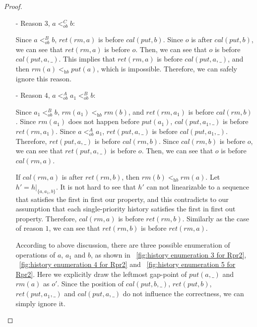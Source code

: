 \documentclass{llncs}
\begin{document}
\begin {proof}
\begin{itemize}
\item[-] Reason $3$, $a <_{\textit{ob}}^C b$:

    Since $a <_{\textit{ob}}^B b$, $\textit{ret}(\textit{rm},a)$ is before $\textit{cal}(\textit{put},b)$. Since $o$ is after $\textit{cal}(\textit{put},b)$, we can see that $\textit{ret}(\textit{rm},a)$ is before $o$. Then, we can see that $o$ is before $\textit{cal}(\textit{put},a,\_)$. This implies that $\textit{ret}(\textit{rm},a)$ is before $\textit{cal}(\textit{put},a,\_)$, and then $\textit{rm}(a) <_{\textit{hb}} \textit{put}(a)$, which is impossible. Therefore, we can safely ignore this reason.

\item[-] Reason $4$, $a <_{\textit{ob}}^A a_1 <_{\textit{ob}}^B b$:

    Since $a_1 <_{\textit{ob}}^B b$, $\textit{rm}(a_1) <_{\textit{hb}} \textit{rm}(b)$, and $\textit{ret}(\textit{rm},a_1)$ is before $\textit{cal}(\textit{rm},b)$. Since $\textit{rm}(a_1)$ does not happen before $\textit{put}(a_1)$, $\textit{cal}(\textit{put},a_1,\_)$ is before $\textit{ret}(\textit{rm},a_1)$. Since $a <_{\textit{ob}}^A a_1$, $\textit{ret}(\textit{put},a,\_)$ is before $\textit{cal}(\textit{put},a_1,\_)$. Therefore, $\textit{ret}(\textit{put},a,\_)$ is before $\textit{cal}(\textit{rm},b)$. Since $\textit{cal}(\textit{rm},b)$ is before $o$, we can see that $\textit{ret}(\textit{put},a,\_)$ is before $o$. Then, we can see that $o$ is before $\textit{cal}(\textit{rm},a)$.

    If $\textit{cal}(\textit{rm},a)$ is after $\textit{ret}(\textit{rm},b)$, then $\textit{rm}(b) <_{\textit{hb}} \textit{rm}(a)$. Let $h' = h \vert_{ \{ a,a_1,b \} }$. It is not hard to see that $h'$ can not linearizable to a sequence that satisfies the first in first our property, and this contradicts to our assumption that each single-priority history satisfies the first in first out property. Therefore, $\textit{cal}(\textit{rm},a)$ is before $\textit{ret}(\textit{rm},b)$. Similarly as the case of reason $1$, we can see that $\textit{ret}(\textit{rm},b)$ is before $\textit{ret}(\textit{rm},a)$.

    According to above discussion, there are three possible enumeration of operations of $a$, $a_1$ and $b$, as shown in \figurename~\ref{fig:history enumeration 3 for Rpr2}, \figurename~\ref{fig:history enumeration 4 for Rpr2} and \figurename~\ref{fig:history enumeration 5 for Rpr2}. Here we explicitly draw the leftmost gap-point of $\textit{put}(a,\_)$ and $\textit{rm}(a)$ as $o'$. Since the position of $\textit{cal}(\textit{put},b,\_)$, $\textit{ret}(\textit{put},b)$, $\textit{ret}(\textit{put},a_1,\_)$ and $\textit{cal}(\textit{put},a,\_)$ do not influence the correctness, we can simply ignore it.


\end{itemize}
\end{proof}
\end{document}
